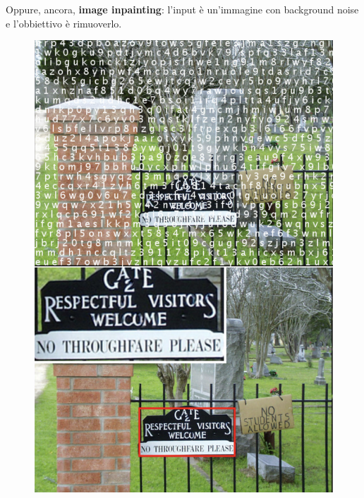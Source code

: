 Oppure, ancora, \textbf{image inpainting}: l'input è un'immagine con background noise e l'obbiettivo è 
rimuoverlo.
\begin{figure}[!h]
  \centering
  \includegraphics[scale=.27]{images/autoencoders/inpainintg.png}
\end{figure}

